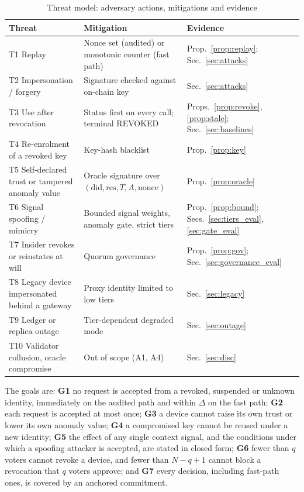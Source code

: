 \begin{table}[t]
\centering
\caption{Threat model: adversary actions, mitigations and evidence}
\label{tab:threats}
\scriptsize
\begin{tabular}{@{}p{1.9cm}p{3.3cm}p{1.8cm}@{}}
\toprule
\textbf{Threat} & \textbf{Mitigation} & \textbf{Evidence} \\
\midrule
T1 Replay & Nonce set (audited) or monotonic counter (fast path) & Prop.~\ref{prop:replay}; Sec.~\ref{sec:attacks} \\
T2 Impersonation / forgery & Signature checked against on-chain key & Sec.~\ref{sec:attacks} \\
T3 Use after revocation & Status first on every call; terminal REVOKED & Props.~\ref{prop:revoke}, \ref{prop:stale}; Sec.~\ref{sec:baselines} \\
T4 Re-enrolment of a revoked key & Key-hash blacklist & Prop.~\ref{prop:key} \\
T5 Self-declared trust or tampered anomaly value & Oracle signature over $(\mathrm{did},\mathrm{res},T,A,\mathrm{nonce})$ & Prop.~\ref{prop:oracle} \\
T6 Signal spoofing / mimicry & Bounded signal weights, anomaly gate, strict tiers & Prop.~\ref{prop:bound}; Secs.~\ref{sec:tiers_eval}, \ref{sec:gate_eval} \\
T7 Insider revokes or reinstates at will & Quorum governance & Prop.~\ref{prop:gov}; Sec.~\ref{sec:governance_eval} \\
T8 Legacy device impersonated behind a gateway & Proxy identity limited to low tiers & Sec.~\ref{sec:legacy} \\
T9 Ledger or replica outage & Tier-dependent degraded mode & Sec.~\ref{sec:outage} \\
T10 Validator collusion, oracle compromise & Out of scope (A1, A4) & Sec.~\ref{sec:disc} \\
\bottomrule
\end{tabular}
\end{table}

The goals are: \textbf{G1} no request is accepted from a revoked, suspended or unknown identity, immediately on the audited path and within $\Delta$ on the fast path; \textbf{G2} each request is accepted at most once; \textbf{G3} a device cannot raise its own trust or lower its own anomaly value; \textbf{G4} a compromised key cannot be reused under a new identity; \textbf{G5} the effect of any single context signal, and the conditions under which a spoofing attacker is accepted, are stated in closed form; \textbf{G6} fewer than $q$ voters cannot revoke a device, and fewer than $N-q+1$ cannot block a revocation that $q$ voters approve; and \textbf{G7} every decision, including fast-path ones, is covered by an anchored commitment.
